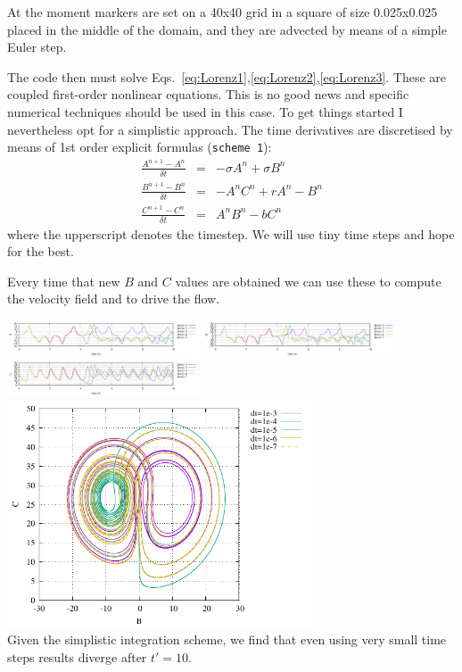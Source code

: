 At the moment markers are set on a 40x40 grid in a square of size 0.025x0.025
placed in the middle of the domain, and they are advected by means of a simple Euler step. 


The code then must solve Eqs.~\eqref{eq:Lorenz1},\eqref{eq:Lorenz2},\eqref{eq:Lorenz3}.
These are coupled first-order nonlinear equations. This is no good news and 
specific numerical techniques should be used in this case. 
To get things started I nevertheless opt for a simplistic approach. 
The time derivatives are discretised by means of 1st order explicit formulas ({\tt scheme 1}):
\begin{eqnarray}
\frac{A^{n+1}-A^n}{\delta t} &=& -\sigma A^n + \sigma B^n \\
\frac{B^{n+1}-B^n}{\delta t} &=& -A^n C^n + rA^n -B^n  \\
\frac{C^{n+1}-C^n}{\delta t} &=& A^n B^n - bC^n \label{eq:Lorenz3}
\end{eqnarray}
where the upperscript denotes the timestep. We will use tiny time steps and hope for the best.

Every time that new $B$ and $C$ values are obtained we can use these to compute the 
velocity field and to drive the flow.


\begin{center}
\includegraphics[width=5.7cm]{python_codes/fieldstone_156/results/scheme1/A.pdf}
\includegraphics[width=5.7cm]{python_codes/fieldstone_156/results/scheme1/B.pdf}
\includegraphics[width=5.7cm]{python_codes/fieldstone_156/results/scheme1/C.pdf}\\
\includegraphics[width=9cm]{python_codes/fieldstone_156/results/scheme1/BC.pdf}\\
{\captionfont Given the simplistic integration scheme, we find that 
even using very small time steps results diverge after $t'=10$.}
\end{center}


